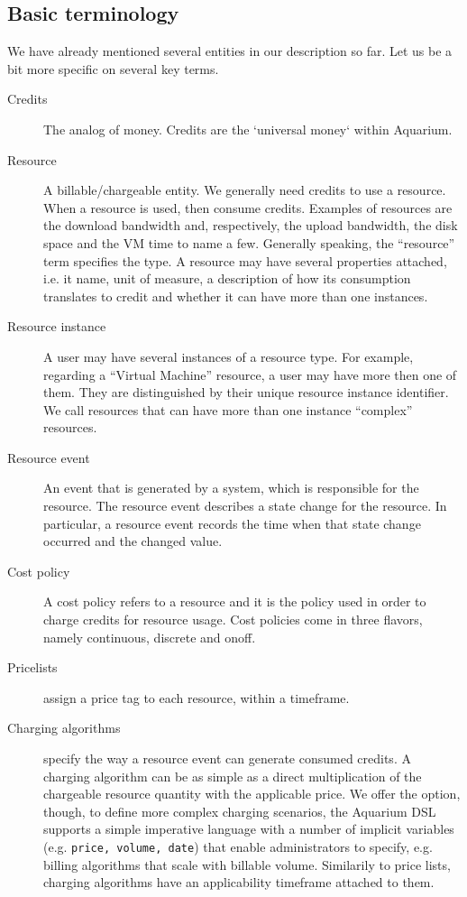 \documentclass[preprint,10pt]{sigplanconf}
\begin{document}
\subsection{Basic terminology}
We have already mentioned several entities in our description so far. Let us be a bit more specific on several key terms.

\begin{description}
\item[Credits]
The analog of money. Credits are the `universal money` within Aquarium.

\item[Resource]
A billable/chargeable entity. We generally need credits to use a resource. When a resource is used,  then consume credits. Examples of resources are the \textsf{download bandwidth} and, respectively,  the \textsf{upload bandwidth}, the \textsf{disk space} and the \textsf{VM time} to name a few. Generally speaking, the ``resource'' term specifies the type. A resource may have several properties attached, i.e. it name, unit of measure, a description of how its consumption translates to credit and whether it can have more than one instances.

\item[Resource instance]
A user may have several instances of a resource type. For example, regarding a ``Virtual Machine'' resource, a user may have more then one of them. They are distinguished by their unique resource instance identifier. We call resources that can have more than one instance ``complex'' resources.

\item[Resource event]
An event that is generated by a system, which is responsible for the resource.
The resource event describes a state change for the resource. In particular, a resource event records the time when that state change occurred and the changed value.

\item[Cost policy]
A cost policy refers to a resource and it is the policy used in order to charge credits for resource usage. Cost policies come in three flavors, namely \textsf{continuous}, \textsf{discrete} and \textsf{onoff}.
          
\item[Pricelists] assign a price tag to each resource, within a timeframe.

\item[Charging algorithms] specify the way a resource event can generate consumed credits. 
A charging algorithm can be as simple as a direct multiplication of the 
        chargeable resource quantity with the applicable price. We offer the option, though, to define more complex charging  scenarios, the Aquarium DSL supports a simple imperative language with
        a number of implicit variables (e.g. \texttt{price, volume, date}) 
        that enable administrators to specify, e.g. billing algorithms that
        scale with billable volume. Similarily to price lists, charging algorithms
        have an applicability timeframe attached to them.
        

\end{description}
\end{document}
